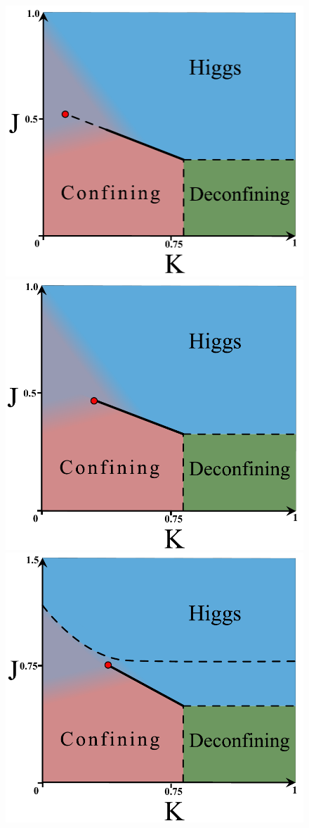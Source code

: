 \begin{figure}[!h]
	\centering
	\includegraphics[width=.32\textwidth]{figures/chapter2/Z2Z2Jl01phasedia.pdf}
	\includegraphics[width=.32\textwidth]{figures/chapter2/Z2Z2Jl1phasedia.pdf}
	\includegraphics[width=.32\textwidth]{figures/chapter2/Z2Z2diffJphasedia.pdf}\\
	\hfill

\end{figure}
